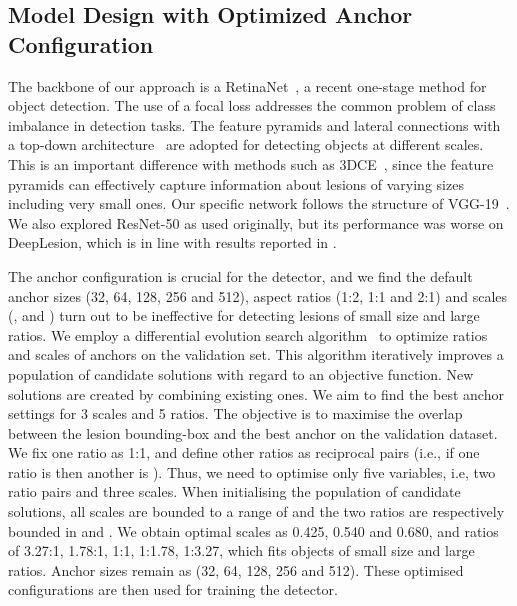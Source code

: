 \documentclass[runningheads,a4paper]{llncs}
\begin{document}
\subsection{Model Design with Optimized Anchor Configuration}

The backbone of our approach is a RetinaNet~\cite{lin2017focal}, a recent one-stage method for object detection.
The use of a focal loss addresses the common problem of class imbalance in detection tasks.
The feature pyramids and lateral connections with a top-down architecture~\cite{lin2017feature} are adopted for detecting objects at different scales.
This is an important difference with methods such as 3DCE~\cite{yan20183dce}, since the feature pyramids can effectively capture information about lesions of varying sizes including very small ones.
Our specific network follows the structure of VGG-19~\cite{simonyan2014very}. 
We also explored ResNet-50 as used originally, but its performance was worse on DeepLesion, which is in line with results reported in \cite{yan2018deeplesion}. 

The anchor configuration is crucial for the detector, and we find the default anchor sizes (32, 64, 128, 256 and 512), aspect ratios (1:2, 1:1 and 2:1) and scales (,  and ) 
turn out to be ineffective for detecting lesions of small size and large ratios.
We employ a differential evolution search algorithm~\cite{storn1997differential} to optimize ratios and scales of anchors on the validation set. This algorithm iteratively improves a population of candidate solutions with regard to an objective function. New solutions are created by combining existing ones. We aim to find the best anchor settings for 3 scales and 5 ratios.
The objective is to maximise the overlap between the lesion bounding-box and the best anchor on the validation dataset.
We fix one ratio as 1:1, and define other ratios as reciprocal pairs (i.e., if one ratio is  then another is ). Thus, we need to optimise only five variables, i.e, two ratio pairs and three scales.
When initialising the population of candidate solutions, all scales are bounded to a range of  and the two ratios are respectively bounded in  and .
We obtain optimal scales as 0.425, 0.540 and 0.680, and ratios of 3.27:1, 1.78:1, 1:1, 1:1.78, 1:3.27, which fits objects of small size and large ratios. Anchor sizes remain as (32, 64, 128, 256 and 512). These optimised configurations are then used for training the detector.



\begin{comment}
The objective function puts a higher weight on lesions which had low overlap with the best anchor by using focal loss.
The goal was to find the best values for 3 scales and 5 ratios. To reduce the number of variables we fixed one ratio to be 1:1 and defined that the ratios should be reciprocals of each other (hence if one ratio is  then the other will be ). This resulted in us only optimising 5 variables. When initialising the population of candidate solutions, all scales were bounded to be between [0.4, 1.6] and the two ratios were bounded between [1, 2] and [2, 4] respectively.
The proposed best scales were 0.425, 0.54 and 0.68 and ratios of 3.27:1, 1.78:1, 1:1, 1:1.78, 1:3.27.
\end{comment}
\end{document}
